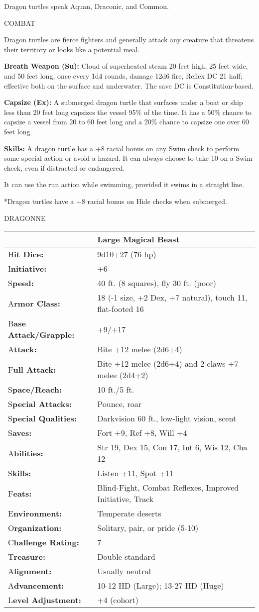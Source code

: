 \documentclass{article}
\begin{document}
{Dragon turtles speak Aquan, Draconic, and Common.

COMBAT

Dragon turtles are fierce fighters and generally attack any creature that threatens 
their territory or looks like a potential meal.

\textbf{Breath Weapon (Su):} Cloud of superheated steam 20 feet high, 25 feet wide, 
and 50 feet long, once every 1d4 rounds, damage 12d6 fire, Reflex DC 21 half; effective 
both on the surface and underwater. The save DC is Constitution-based.

\textbf{Capsize (Ex): }A submerged dragon turtle that surfaces under a boat or 
ship less than 20 feet long capsizes the vessel 95\% of the time. It has a 50\% 
chance to capsize a vessel from 20 to 60 feet long and a 20\% chance to capsize 
one over 60 feet long. 

\textbf{Skills:} A dragon turtle has a +8 racial bonus on any Swim check to perform 
some special action or avoid a hazard. It can always choose to take 10 on a Swim 
check, even if distracted or endangered.

It can use the run action while swimming, provided it swims in a straight line.

*Dragon turtles have a +8 racial bonus on Hide checks when submerged.

\vspace{12pt}
{\LARGE{}DRAGONNE}

\begin{tabular}{|>{\raggedright}p{91pt}|>{\raggedright}p{230pt}|}
\hline
  & Large Magical Beast\tabularnewline
\hline
H\textbf{it Dice:} & 9d10+27 (76 hp)\tabularnewline
\hline
I\textbf{nitiative:} & +6\tabularnewline
\hline
S\textbf{peed:} & 40 ft. (8 squares), fly 30 ft. (poor)\tabularnewline
\hline
A\textbf{rmor Class:} & 18 (-1 size, +2 Dex, +7 natural), touch 11, flat-footed 
16\tabularnewline
\hline
B\textbf{ase Attack/Grapple:} & +9/+17\tabularnewline
\hline
A\textbf{ttack:} & Bite +12 melee (2d6+4)\tabularnewline
\hline
F\textbf{ull Attack:} & Bite +12 melee (2d6+4) and 2 claws +7 melee (2d4+2)\tabularnewline
\hline
S\textbf{pace/Reach:} & 10 ft./5 ft.\tabularnewline
\hline
S\textbf{pecial Attacks:} & Pounce, roar\tabularnewline
\hline
S\textbf{pecial Qualities:} & Darkvision 60 ft., low-light vision, scent\tabularnewline
\hline
S\textbf{aves:} & Fort +9, Ref +8, Will +4\tabularnewline
\hline
A\textbf{bilities:} & Str 19, Dex 15, Con 17, Int 6, Wis 12, Cha 12\tabularnewline
\hline
S\textbf{kills:} & Listen +11, Spot +11\tabularnewline
\hline
F\textbf{eats:} & Blind-Fight, Combat Reflexes, Improved Initiative, Track\tabularnewline
\hline
E\textbf{nvironment:} & Temperate deserts\tabularnewline
\hline
O\textbf{rganization:} & Solitary, pair, or pride (5-10)\tabularnewline
\hline
C\textbf{hallenge Rating:} & 7\tabularnewline
\hline
T\textbf{reasure:} & Double standard\tabularnewline
\hline
A\textbf{lignment:} & Usually neutral\tabularnewline
\hline
A\textbf{dvancement:} & 10-12 HD (Large); 13-27 HD (Huge)\tabularnewline
\hline
L\textbf{evel Adjustment:} & +4 (cohort)\tabularnewline
\hline
\end{tabular}

}
\end{document}

